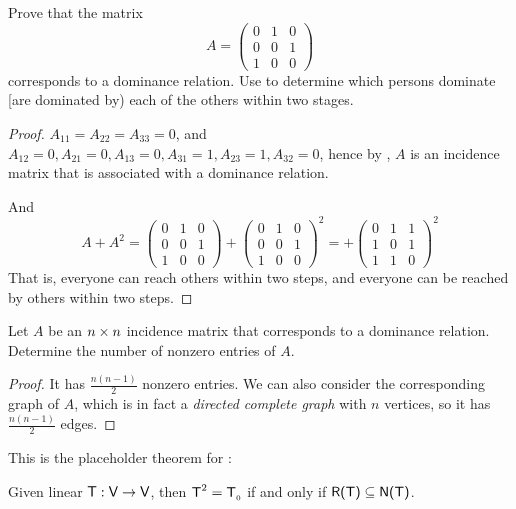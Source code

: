 \begin{exercise} \label{exercise 2.3.23}
Prove that the matrix
\[
    A = \begin{pmatrix}
        0 & 1 & 0 \\
        0 & 0 & 1 \\
        1 & 0 & 0
    \end{pmatrix}
\]
corresponds to a dominance relation.
Use  to determine which persons dominate [are dominated by) each of the others within two stages.
\end{exercise}

\begin{proof}
\(A_{11} = A_{22} = A_{33} = 0\), and \(A_{12} = 0, A_{21} = 0, A_{13} = 0, A_{31} = 1, A_{23} = 1, A_{32} = 0\), hence by , \(A\) is an incidence matrix that is associated with a dominance relation.

And
\[
    A + A^2
    = \begin{pmatrix}
        0 & 1 & 0 \\
        0 & 0 & 1 \\
        1 & 0 & 0
    \end{pmatrix}
    + \begin{pmatrix}
        0 & 1 & 0 \\
        0 & 0 & 1 \\
        1 & 0 & 0
    \end{pmatrix}^2
    = + \begin{pmatrix}
        0 & 1 & 1 \\
        1 & 0 & 1 \\
        1 & 1 & 0
    \end{pmatrix}^2
\]
That is, everyone can reach others within two steps, and everyone can be reached by others within two steps.
\end{proof}

\begin{exercise} \label{exercise 2.3.24}
Let \(A\) be an \(n \times n\) incidence matrix that corresponds to a dominance relation.
Determine the number of nonzero entries of \(A\).
\end{exercise}

\begin{proof}
It has \(\frac{n(n-1)}{2}\) nonzero entries.
We can also consider the corresponding graph of \(A\), which is in fact a \emph{directed complete graph} with \(n\) vertices, so it has \(\frac{n(n-1)}{2}\) edges.
\end{proof}

\begin{additional theorem} \label{athm 2.25}
This is the placeholder theorem for :

Given linear \(\textsf{T} : \textsf{V} \to \textsf{V}\), then \(\textsf{T}^2 = \textsf{T}_{_0}\) if and only if \(\textsf{R(T)} \subseteq \textsf{N(T)}\).
\end{additional theorem}

